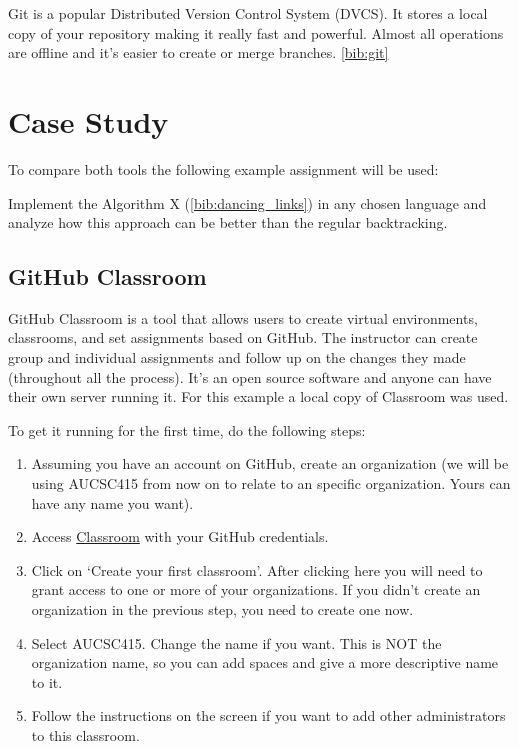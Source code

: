 \documentclass[12pt]{article}
\begin{document}
Git is a popular Distributed Version Control System (DVCS). It stores a local copy of your repository making it really fast and powerful. Almost all operations are offline and it's easier to create or merge branches. \ref{bib:git}


\section{Case Study}

To compare both tools the following example assignment will be used: 

Implement the Algorithm X (\ref{bib:dancing_links}) in any chosen language and analyze how this approach can be better than the regular backtracking.

\subsection{GitHub Classroom}

GitHub Classroom is a tool that allows users to create virtual environments, classrooms, and set assignments based on GitHub. The instructor can create group and individual assignments and follow up on the changes they made (throughout all the process). It's an open source software and anyone can have their own server running it. For this example a local copy of Classroom was used.

To get it running for the first time, do the following steps:

\begin{enumerate}

\item Assuming you have an account on GitHub, create an organization (we will be using AUCSC415 from now on to relate to an specific organization. Yours can have any name you want).

\item Access \href{https://classroom.github.com}{Classroom} with your GitHub credentials. 

\item Click on `Create your first classroom'. After clicking here you will need to grant access to one or more of your organizations. If you didn't create an organization in the previous step, you need to create one now.

\item Select AUCSC415. Change the name if you want. This is NOT the organization name, so you can add spaces and give a more descriptive name to it.

\item Follow the instructions on the screen if you want to add other administrators to this classroom.

\end{enumerate}
\end{document}
